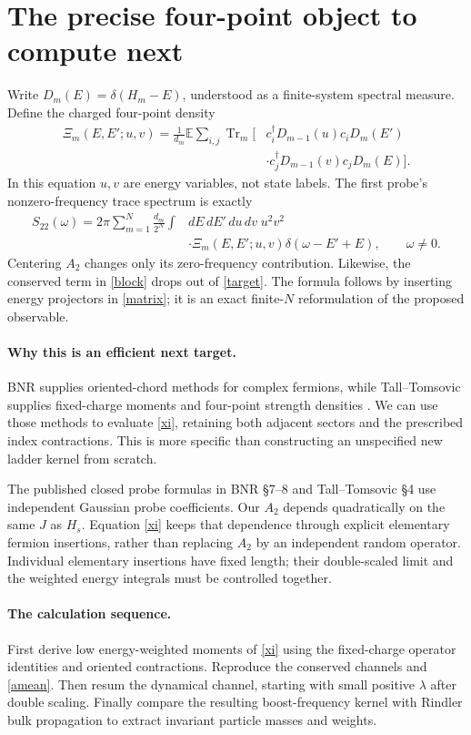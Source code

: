 \documentclass[11pt,a4paper]{article}
\newcommand{\Tr}{\operatorname{Tr}}
\newcommand{\E}{\mathbb E}
\begin{document}
\newpage
\section{The precise four-point object to compute next}
Write $D_m(E)=\delta(H_m-E)$, understood as a finite-system spectral
measure. Define the charged four-point density
\begin{align}
 \Xi_m(E,E';u,v)=\frac{1}{d_m}\E\sum_{i,j}\Tr_m\big[&
 c_i^\dagger D_{m-1}(u)c_i D_m(E')\nonumber\\[-2pt]
 &\cdot c_j^\dagger D_{m-1}(v)c_j D_m(E)\big].\label{xi}
\end{align}
In this equation $u,v$ are energy variables, not state labels.
The first probe's nonzero-frequency trace spectrum is exactly
\begin{align}
 S_{22}(\omega)=2\pi\sum_{m=1}^N\frac{d_m}{2^N}
 \int &dE\,dE'\,du\,dv\;u^2v^2\nonumber\\[-2pt]
 &\cdot\Xi_m(E,E';u,v)\delta(\omega-E'+E),\qquad\omega\ne0.\label{target}
\end{align}
Centering $A_2$ changes only its zero-frequency contribution. Likewise,
the conserved term in \eqref{block} drops out of \eqref{target}. The
formula follows by inserting energy projectors in \eqref{matrix};
it is an exact finite-$N$ reformulation of the proposed observable.

\paragraph{Why this is an efficient next target.}
BNR supplies oriented-chord methods for complex fermions, while
Tall--Tomsovic supplies fixed-charge moments and four-point strength
densities \cite{bnr,tt}. We can use those methods to evaluate
\eqref{xi}, retaining both adjacent sectors and the prescribed index
contractions. This is more specific than constructing an unspecified
new ladder kernel from scratch.

The published closed probe formulas in BNR \S7--8 and
Tall--Tomsovic \S4 use independent Gaussian probe coefficients.
Our $A_2$ depends quadratically on the same $J$ as $H_s$.
Equation \eqref{xi} keeps that dependence through explicit elementary
fermion insertions, rather than replacing $A_2$ by an independent
random operator. Individual elementary insertions have fixed length;
their double-scaled limit and the weighted energy integrals must be
controlled together.

\paragraph{The calculation sequence.}
First derive low energy-weighted moments of \eqref{xi} using the
fixed-charge operator identities and oriented contractions. Reproduce
the conserved channels and \eqref{amean}. Then resum the dynamical
channel, starting with small positive $\lambda$ after double scaling.
Finally compare the resulting boost-frequency kernel with Rindler
bulk propagation to extract invariant particle masses and weights.
\end{document}
